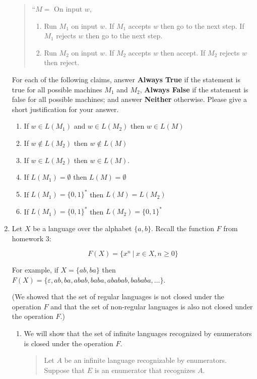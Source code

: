 \documentclass[10pt,letterpaper,unboxed,cm]{article}
\begin{document}
\begin{enumerate}
\begin{quote}
``$M =$ On input $w$,
\begin{enumerate}
\item
Run $M_1$ on input $w$. If $M_1$ accepts $w$ then go to the next step. If $M_1$ rejects $w$ then go to the next step.
\item
Run $M_2$ on input $w$. If $M_2$ accepts $w$ then accept. If $M_2$ rejects $w$ then reject.
\end{enumerate}
\end{quote}

For each of the following claims, answer {\bf Always True} if the statement is true for all possible machines $M_1$ and $M_2$, {\bf Always False} if the statement is false for all possible machines; and answer {\bf Neither} otherwise. Please give a short justification for your answer.

\begin{enumerate}
\item
If $w\in L(M_1)$ and $w\in L(M_2)$ then $w\in L(M)$
\item
If $w\notin L(M_2)$ then $w \notin L(M)$
\item
If $w \in L(M_2)$ then $w \in L(M)$.
\item
If $L(M_1) = \emptyset$ then $L(M)=\emptyset$
\item
If $L(M_1) = \{0,1\}^*$ then $L(M)=L(M_2)$
\item
If $L(M_1) = \{0,1\}^*$ then $L(M_2) = \{0,1\}^*$
\end{enumerate}

\item
Let $X$ be a language over the alphabet $\{a,b\}$. Recall the function $F$ from homework 3: 

$$F(X) = \{x^n~|~x\in X, n\geq 0\}$$

For example, if $X=\{ab,ba\}$ then $F(X) = \{\varepsilon, ab, ba, abab, baba, ababab, bababa,\dots\}$.

(We showed that the set of regular languages is not closed under the operation $F$ and that the set of non-regular languages is also not closed under the operation $F$.)

\begin{enumerate}

\item
We will show that the set of infinite languages recognized by enumerators is closed under the operation $F$.

\begin{quote}
Let $A$ be an infinite language recognizable by enumerators. Suppose that $E$ is an enumerator that recognizes $A$.


\end{quote}
\end{enumerate}
\end{enumerate}
\end{document}
